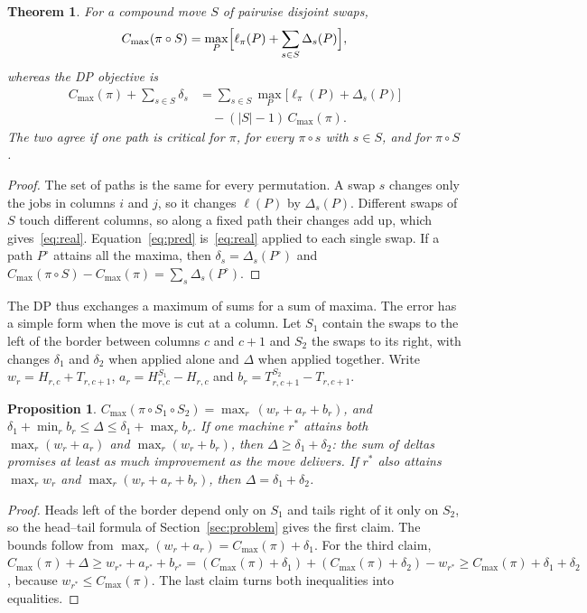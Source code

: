 \documentclass[letterpaper]{article} %
\newtheorem{proposition}{Proposition}
\newtheorem{theorem}{Theorem}
\theoremstyle{definition}
\begin{document}
\begin{theorem}\label{thm:paths}
For a compound move $S$ of pairwise disjoint swaps,
\begin{equation}\label{eq:real}
C_{\max}(\pi\circ S)=\max_P\Bigl[\ell_\pi(P)+\sum_{s\in S}\Delta_s(P)\Bigr],
\end{equation}
whereas the DP objective is
\begin{equation}\label{eq:pred}
\begin{split}
C_{\max}(\pi)+\sum_{s\in S}\delta_s
&=\sum_{s\in S}\max_P\bigl[\ell_\pi(P)+\Delta_s(P)\bigr]\\
&\quad-(|S|-1)\,C_{\max}(\pi).
\end{split}
\end{equation}
The two agree if one path is critical for $\pi$, for every $\pi\circ s$
with $s\in S$, and for $\pi\circ S$.
\end{theorem}
\begin{proof}
The set of paths is the same for every permutation. A swap $s$ changes
only the jobs in columns $i$ and $j$, so it changes $\ell(P)$ by
$\Delta_s(P)$. Different swaps of $S$ touch different columns, so along a
fixed path their changes add up, which gives~\eqref{eq:real}.
Equation~\eqref{eq:pred} is~\eqref{eq:real} applied to each single swap.
If a path $P^\circ$ attains all the maxima, then $\delta_s=\Delta_s(P^\circ)$
and $C_{\max}(\pi\circ S)-C_{\max}(\pi)=\sum_s\Delta_s(P^\circ)$.
\end{proof}

The DP thus exchanges a maximum of sums for a sum of maxima. The error
has a simple form when the move is cut at a column. Let $S_1$ contain the
swaps to the left of the border between columns $c$ and $c+1$ and $S_2$
the swaps to its right, with changes $\delta_1$ and $\delta_2$ when
applied alone and $\Delta$ when applied together. Write $w_r=H_{r,c}+T_{r,c+1}$,
$a_r=H^{S_1}_{r,c}-H_{r,c}$ and $b_r=T^{S_2}_{r,c+1}-T_{r,c+1}$.

\begin{proposition}\label{prop:join}
$C_{\max}(\pi\circ S_1\circ S_2)=\max_r\,(w_r+a_r+b_r)$, and
$\delta_1+\min_r b_r\leq\Delta\leq\delta_1+\max_r b_r$. If one machine
$r^\ast$ attains both $\max_r(w_r+a_r)$ and $\max_r(w_r+b_r)$, then
$\Delta\geq\delta_1+\delta_2$: the sum of deltas promises at least as
much improvement as the move delivers. If $r^\ast$ also attains
$\max_r w_r$ and $\max_r(w_r+a_r+b_r)$, then $\Delta=\delta_1+\delta_2$.
\end{proposition}
\begin{proof}
Heads left of the border depend only on $S_1$ and tails right of it only
on $S_2$, so the head--tail formula of Section~\ref{sec:problem} gives the first claim.
The bounds follow from $\max_r(w_r+a_r)=C_{\max}(\pi)+\delta_1$. For the
third claim,
$C_{\max}(\pi)+\Delta\geq w_{r^\ast}+a_{r^\ast}+b_{r^\ast}
=(C_{\max}(\pi)+\delta_1)+(C_{\max}(\pi)+\delta_2)-w_{r^\ast}
\geq C_{\max}(\pi)+\delta_1+\delta_2$, because
$w_{r^\ast}\leq C_{\max}(\pi)$. The last claim turns both inequalities
into equalities.
\end{proof}
\end{document}
